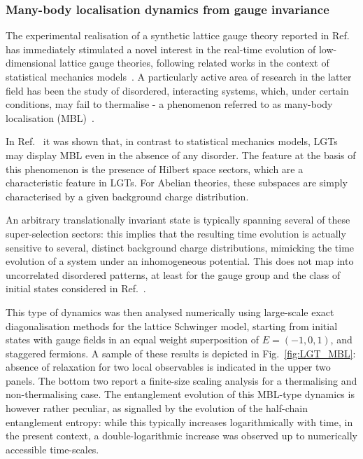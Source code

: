 \documentclass[epj,final]{svjour}
\begin{document}
\subsubsection{Many-body localisation dynamics from gauge invariance\cite{brenes2018many}}

The experimental realisation of a synthetic lattice gauge theory reported in Ref.~\cite{martinez2016real} has immediately stimulated a novel interest in the real-time evolution of low-dimensional lattice gauge theories, following related works in the context of statistical mechanics models~\cite{Polkovnikov2011b}. A particularly active area of research in the latter field has been the study of disordered, interacting systems, which, under certain conditions, may fail to thermalise - a phenomenon referred to as many-body localisation (MBL)~\cite{Basko:2006hh}.

In Ref.~\cite{brenes2018many} it was shown that, in contrast to statistical mechanics models, LGTs may  display MBL even in the absence of any disorder. The feature at the basis of this phenomenon is the presence of Hilbert space sectors, which are a characteristic feature in LGTs. For Abelian theories, these subspaces are simply characterised by a given background charge distribution.

An arbitrary translationally invariant state is typically spanning several of these super-selection sectors: this implies that the resulting time evolution is actually sensitive to several, distinct background charge distributions, mimicking the time evolution of a system under an inhomogeneous potential. This does not map into uncorrelated disordered patterns, at least for the gauge group and the class of initial states considered in Ref.~\cite{brenes2018many}.

This type of dynamics was then analysed numerically using large-scale exact diagonalisation methods for the lattice Schwinger model, starting from initial states with gauge fields in an equal weight superposition of $E=(-1,0,1)$, and staggered fermions. A sample of these results is depicted in Fig.~\ref{fig:LGT_MBL}: absence of relaxation for two local observables is indicated in the upper two panels. The bottom two report a finite-size scaling analysis for a thermalising and non-thermalising case. The entanglement evolution of this MBL-type dynamics is however rather peculiar, as signalled by the evolution of the half-chain entanglement entropy: while this typically increases logarithmically with time, in the present context, a double-logarithmic increase was observed up to numerically accessible time-scales. 
\end{document}
